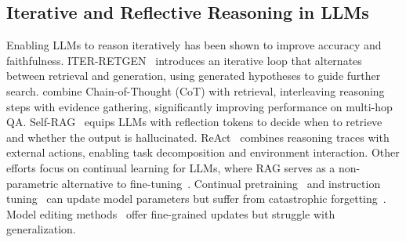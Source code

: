 \subsection{Iterative and Reflective Reasoning in LLMs}

Enabling LLMs to reason iteratively has been shown to improve accuracy and faithfulness. ITER-RETGEN~\citep{shao2023enhancingretrievalaugmentedlargelanguage} introduces an iterative loop that alternates between retrieval and generation, using generated hypotheses to guide further search. \citet{trivedi2023interleavingretrievalchainofthoughtreasoning} combine Chain-of-Thought (CoT) with retrieval, interleaving reasoning steps with evidence gathering, significantly improving performance on multi-hop QA. 
Self-RAG~\citep{asai2023selfraglearningretrievegenerate} equips LLMs with reflection tokens to decide when to retrieve and whether the output is hallucinated. ReAct~\citep{yao2023react} combines reasoning traces with external actions, enabling task decomposition and environment interaction. 
Other efforts focus on continual learning for LLMs, where RAG serves as a non-parametric alternative to fine-tuning~\citep{shi2024continual}. Continual pretraining~\citep{lifelong} and instruction tuning~\citep{citb} can update model parameters but suffer from catastrophic forgetting~\citep{huang24mitigating}. Model editing methods~\citep{yao23editing} offer fine-grained updates but struggle with generalization. 


